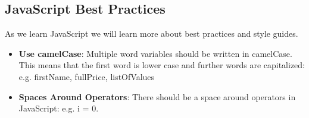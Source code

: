 \documentclass[11pt,a4paper]{report}
\newcommand{\bfb}[1]{{\bf \color{blue} #1}}
\begin{document}
\subsection{JavaScript Best Practices}

As we learn JavaScript we will learn more about best practices and style guides. 

\begin{itemize}
\item \bfb{Use camelCase}: Multiple word variables should be written in camelCase.  This means that the first word is lower case and further words are capitalized: e.g. firstName, fullPrice, listOfValues

\item \bfb{Spaces Around Operators}: There should be a space around operators in JavaScript: e.g. i = 0.
\end{itemize}
\end{document}
